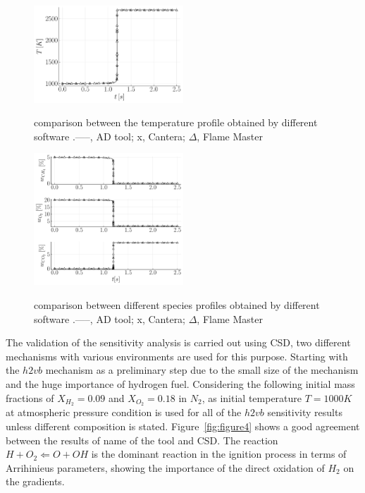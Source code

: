 \documentclass[preprint,review,12pt]{elsarticle}
\begin{document}
      \begin{figure}
\centering
 {\includegraphics[width=0.5\textwidth]{figures/T validation.pdf}}
\caption{comparison between the temperature profile obtained by different software .-----, AD tool; x, Cantera; $\Delta$, Flame Master  }
    \label{fig:figure2}
 \end{figure}   
 \begin{figure}
\centering
 {\includegraphics[width=0.5\textwidth]{figures/all validation.pdf}}
\caption{comparison between different species profiles obtained by different software .-----, AD tool; x, Cantera; $\Delta$, Flame Master}
    \label{fig:figure3}
\end{figure}
The validation of the sensitivity analysis is carried out using CSD, two different mechanisms with various environments are used for this purpose. Starting with the $h2vb$ mechanism as a preliminary step due to the small size of the mechanism and the huge importance of hydrogen fuel. Considering the following  initial mass fractions of $X_{H_2} = 0.09$ and $X_{O_2} = 0.18$ in $N_2$, as initial temperature $T=1000 K$ at atmospheric pressure condition is used for all of the $h2vb$ sensitivity results unless different composition is stated. Figure~\ref{fig:figure4} shows a good agreement between the results of {\color{red} name of the tool} and CSD.  The reaction  $H+O_2\Leftarrow O+OH$ is the dominant reaction in the ignition process in terms of Arrihinieus parameters, showing the importance of the direct oxidation of $H_2$ on the gradients.
 
\end{document}
